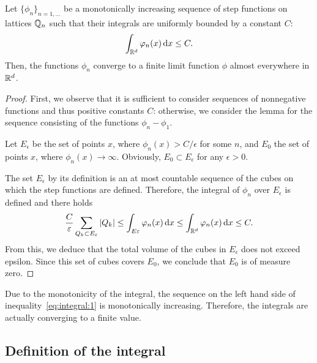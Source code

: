 \begin{lemma}
  \label{lemma:integral:2}
  Let $\{\phi_n\}_{n=1,\dots}$ be a monotonically increasing sequence
  of step functions on lattices $\mathbb Q_n$ such that their integrals are
  uniformly bounded by a constant $C$:
  \begin{gather}
    \label{eq:integral:1}
    \int_{\mathbb R^d} \varphi_n(x) \,\mathrm{d} x \le C.
  \end{gather}
  Then, the functions $\phi_n$ converge to a finite limit function
  $\phi$ almost everywhere in $\mathbb R^d$.
\end{lemma}

\begin{proof}
  First, we observe that it is sufficient to consider sequences of
  nonnegative functions and thus positive constants $C$: otherwise, we
  consider the lemma for the sequence consisting of the functions
  $\phi_n-\phi_1$.

  Let $E_\epsilon$ be the set of points $x$, where $\phi_n(x) >
  C/\epsilon$ for some $n$, and $E_0$ the set of points $x$, where
  $\phi_n(x) \to \infty$. Obviously, $E_0\subset E_\epsilon$ for any
  $\epsilon > 0$.
  
  The set $E_\epsilon$ by its definition is an at most countable
  sequence of the cubes on which the step functions are
  defined. Therefore, the integral of $\phi_n$ over $E_\epsilon$ is
  defined and there holds
  \begin{gather*}
    \frac{C}{\varepsilon}\sum_{Q_{k}\subset E_\varepsilon} |Q_{k}|
    \le \int_{E\varepsilon} \varphi_n(x) \,\mathrm{d} x
    \le \int_{\mathbb R^d} \varphi_n(x) \,\mathrm{d} x \le C.
  \end{gather*}
  From this, we deduce that the total volume of the cubes in
  $E_\epsilon$ does not exceed epsilon. Since this set of cubes
  covers $E_0$, we conclude that $E_0$ is of measure zero.
\end{proof}

\begin{remark}
  \label{remark:integral:1}
  Due to the monotonicity of the integral, the sequence on the left
  hand side of inequality~\eqref{eq:integral:1} is monotonically
  increasing. Therefore, the integrals are actually converging to a
  finite value.
\end{remark}

\subsection{Definition of the integral}

